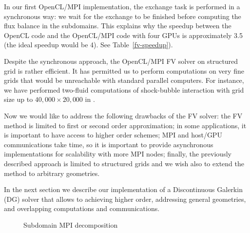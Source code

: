 \documentclass{svmult}
\begin{document}
In our first OpenCL/MPI implementation, the exchange task is performed
in a synchronous way: we wait for the exchange to be finished before
computing the flux balance in the subdomains.  This explains why the
speedup between the OpenCL code and the OpenCL/MPI code with four GPUs
is approximately 3.5 (the ideal speedup would be 4). See
Table~\ref{fv-speedup}).

Despite the synchronous approach, the OpenCL/MPI FV solver on
structured grid is rather efficient. It has permitted us to perform
computations on very fine grids that would be unreachable with
standard parallel computers. For instance, we have performed two-fluid
computations of shock-bubble interaction with grid size up to
$40,000\times 20,000$ in \cite{helluy2014interpolated}.

Now we would like to address the following drawbacks of the FV solver:
the FV method is limited to first or second order approximation; in
some applications, it is important to have access to higher order
schemes; MPI and host/GPU communications take time, so it is important
to provide asynchronous implementations for scalability with more MPI
nodes; finally, the previously described approach is limited to
structured grids and we wish also to extend the method to arbitrary
geometries.

In the next section we describe our implementation of a Discontinuous
Galerkin (DG) solver that allows to achieving higher order, addressing
general geometries, and overlapping computations and communications.
\begin{figure}
  \centering
  \caption{Subdomain MPI decomposition\label{fig:mpi}}
\end{figure}
\end{document}
